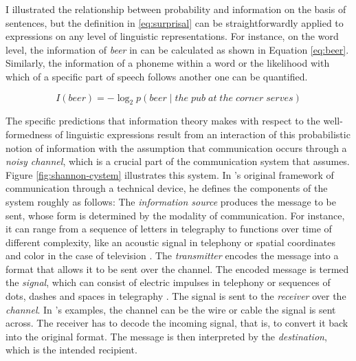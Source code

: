 I illustrated the relationship between probability and information on the basis of sentences, but the definition in \ref{eq:surprisal} can be straightforwardly applied to expressions on any level of linguistic representations. For instance, on the word level, the information of \textit{beer} in \Last[a] can be calculated as shown in Equation \ref{eq:beer}. Similarly, the information of a phoneme within a word or the likelihood with which  of a specific part of speech follows another one can be quantified.

\begin{equation}
 I(beer) = - \log_2 p(beer\mathbin{|}the\; pub\; at\; the\; corner\; serves)\label{eq:beer}
\end{equation}

The specific predictions that information theory makes with respect to the well-formedness of linguistic expressions result from an interaction of this probabilistic notion of information with the assumption that communication occurs through a \textit{noisy channel}, which is a crucial part of the communication system that \citet{shannon1948} assumes. Figure \ref{fig:shannon-cystem} illustrates this system. In \citeauthor{shannon1948}'s original framework of communication through a technical device, he defines the components of the system roughly as follows: The \textit{information source} produces the message to be sent, whose form is determined by the modality of communication. For instance, it can range from a sequence of letters in telegraphy to functions over time of different complexity, like an acoustic signal in telephony or spatial coordinates and color in the case of television \citep[380--381]{shannon1948}. The \textit{transmitter} encodes the message into a format that allows it to be sent over the channel. The encoded message is termed the \textit{signal}, which can consist of electric impulses in telephony or sequences of dots, dashes and spaces in telegraphy \citep[382]{shannon1948}. The signal is sent to the \textit{receiver} over the \textit{channel}. In \citeauthor{shannon1948}'s examples, the channel can be the wire or cable the signal is sent across. The receiver has to decode the incoming signal, that is, to convert it back into the original format. The message is then interpreted by the \textit{destination}, which is the intended recipient.

